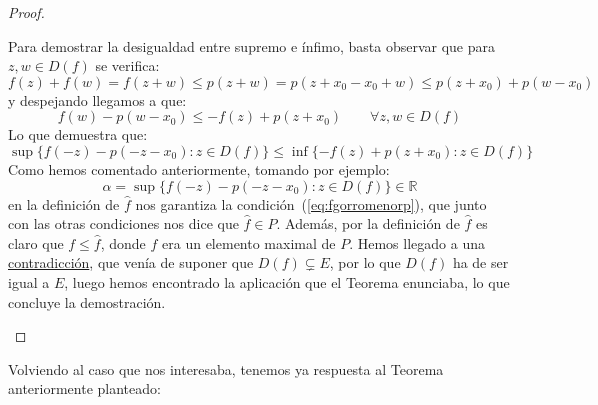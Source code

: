 \begin{teo}
\begin{proof}
\begin{itemize}
                Para demostrar la desigualdad entre supremo e ínfimo, basta observar que para $z,w\in D(f)$ se verifica:
                \begin{equation*}
                    f(z) + f(w) = f(z+w) \leq p(z+w) = p(z+x_0-x_0+w) \leq p(z+x_0) + p(w-x_0)
                \end{equation*}
                y despejando llegamos a que:
                \begin{equation*}
                    f(w) - p(w-x_0) \leq -f(z) + p(z+x_0) \qquad \forall z,w\in D(f)
                \end{equation*}
                Lo que demuestra que:
                \begin{equation*}
                    \sup\{f(-z)-p(-z-x_0) : z\in D(f)\} \leq \inf\{-f(z)+p(z+x_0) : z\in D(f)\}
                \end{equation*}
                Como hemos comentado anteriormente, tomando por ejemplo:
                \begin{equation*}
                    \alpha = \sup\{f(-z)-p(-z-x_0) : z\in D(f)\} \in \mathbb{R}
                \end{equation*}
                en la definición de $\hat{f}$ nos garantiza la condición~(\ref{eq:fgorromenorp}), que junto con las otras condiciones nos dice que $\hat{f}\in P$. Además, por la definición de $\hat{f}$ es claro que $f\leq \hat{f}$, donde $f$ era un elemento maximal de $P$. Hemos llegado a una \underline{contradicción}, que venía de suponer que $D(f)\subsetneq E$, por lo que $D(f)$ ha de ser igual a $E$, luego hemos encontrado la aplicación que el Teorema enunciaba, lo que concluye la demostración.
        \end{itemize}
    \end{proof}
\end{teo}

\noindent
Volviendo al caso que nos interesaba, tenemos ya respuesta al Teorema anteriormente planteado:

